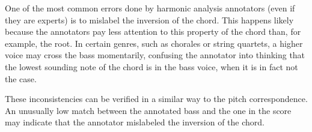 
One of the most common errors done by harmonic analysis
annotators (even if they are experts) is to mislabel the
inversion of the chord. This happens likely because the
annotators pay less attention to this property of the chord
than, for example, the root. In certain genres, such as
chorales or string quartets, a higher voice may cross the
bass momentarily, confusing the annotator into thinking that
the lowest sounding note of the chord is in the bass voice,
when it is in fact not the case.

These inconsistencies can be verified in a similar way to
the pitch correspondence. An unusually low match between the
annotated bass and the one in the score may indicate that
the annotator mislabeled the inversion of the chord.